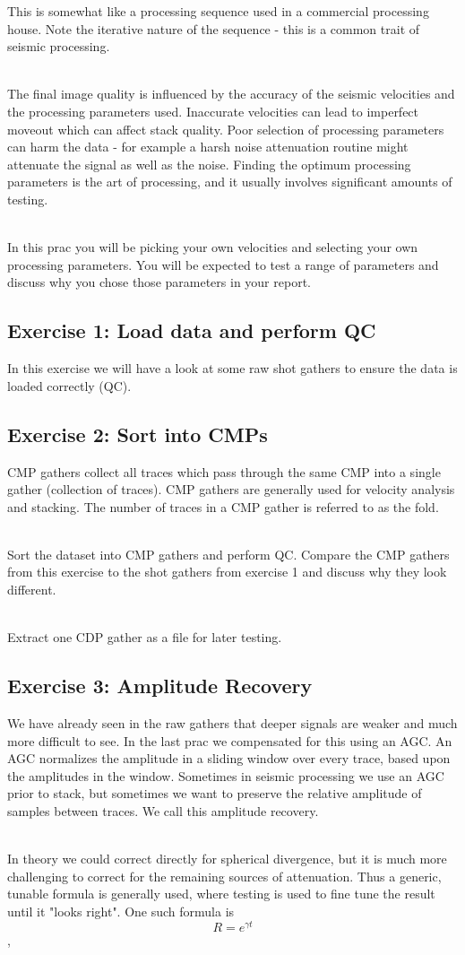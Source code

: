 This is somewhat like a processing sequence used in a commercial processing house.  Note the iterative nature of the sequence - this is a common trait of seismic processing.
\par~\\
The final image quality is influenced by the accuracy of the seismic velocities and the processing parameters used.  Inaccurate velocities can lead to imperfect moveout which can affect stack quality.  Poor selection of processing parameters can harm the data - for example a harsh noise attenuation routine might attenuate the signal as well as the noise. Finding the optimum processing parameters is the art of processing, and it usually involves significant amounts of testing.
\par~\\
In this prac you will be picking your own velocities and selecting your own processing parameters.  You will be expected to test a range of parameters and discuss why you chose those parameters in your report.  
\subsection*{Exercise 1: Load data and perform QC}
In this exercise we will have a look at some raw shot gathers to ensure the data is loaded correctly (QC).
\subsection*{Exercise 2: Sort into CMPs}
CMP gathers collect all traces which pass through the same CMP into a single gather (collection of traces).  CMP gathers are generally used for velocity analysis and stacking. The number of traces in a CMP gather is referred to as the fold.  
\par~\\
Sort the dataset into CMP gathers and perform QC.  Compare the CMP gathers from this exercise to the shot gathers from exercise 1 and discuss why they look different.
\par~\\
Extract one CDP gather as a file for later testing.  

\subsection*{Exercise 3: Amplitude Recovery}
We have already seen in the raw gathers that deeper signals are weaker and much more difficult to see. In the last prac we compensated for this using an AGC.  An AGC normalizes the amplitude in a sliding window over every trace, based upon the amplitudes in the window.  Sometimes in seismic processing we use an AGC prior to stack, but sometimes we want to preserve the relative amplitude of samples between traces.  We call this amplitude recovery.
\par~\\
In theory we could correct directly for spherical divergence, but it is much more challenging to correct for the remaining sources of attenuation.  Thus a generic, tunable formula is generally used, where testing is used to fine tune the result until it "looks right".  One such formula is
\[ R = e^{\gamma t}\],

